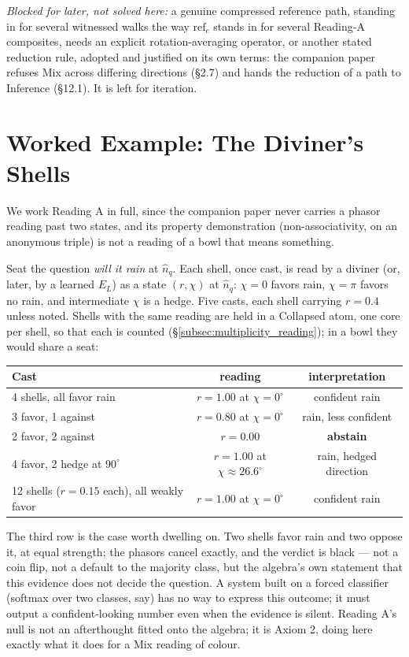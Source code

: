 \documentclass[12pt, a4paper]{article}
\begin{document}
\emph{Blocked for later, not solved here:} a genuine compressed
reference path, standing in for several witnessed walks the way
$\mathrm{ref}_c$ stands in for several Reading-A composites, needs
an explicit rotation-averaging operator, or another stated reduction
rule, adopted and justified on its own terms: the companion paper
refuses Mix across differing directions (\S2.7) and hands the reduction
of a path to Inference (\S12.1). It is left for iteration.

\section{Worked Example: The Diviner's Shells}
\label{sec:worked_example}

We work Reading A in full, since the companion paper never carries a
phasor reading past two states, and its property demonstration
(non-associativity, on an anonymous triple) is not a reading of a
bowl that means something.

Seat the question \emph{will it rain} at $\hat n_q$. Each shell, once
cast, is read by a diviner (or, later, by a learned $E_L$) as a state
$(r,\chi)$ at $\hat n_q$: $\chi=0$ favors rain, $\chi=\pi$ favors no
rain, and intermediate $\chi$ is a hedge. Five casts, each shell carrying $r=0.4$ unless noted. Shells with the same reading are held in a
Collapsed atom, one core per shell, so that each is counted (\S\ref{subsec:multiplicity_reading}); in a
bowl they would share a seat:

\begin{center}
\begin{tabular}{lcc}
\hline
Cast & reading & interpretation \\
\hline
4 shells, all favor rain      & $r=1.00$ at $\chi=0^\circ$   & confident rain \\
3 favor, 1 against            & $r=0.80$ at $\chi=0^\circ$   & rain, less confident \\
2 favor, 2 against            & $r=0.00$                     & \textbf{abstain} \\
4 favor, 2 hedge at $90^\circ$ & $r=1.00$ at $\chi\approx 26.6^\circ$ & rain, hedged direction \\
12 shells ($r=0.15$ each), all weakly favor    & $r=1.00$ at $\chi=0^\circ$   & confident rain \\
\hline
\end{tabular}
\end{center}

The third row is the case worth dwelling on. Two shells favor rain and
two oppose it, at equal strength; the phasors cancel exactly, and the
verdict is black --- not a coin flip, not a default to the majority
class, but the algebra's own statement that this evidence does not
decide the question. A system built on a forced classifier (softmax
over two classes, say) has no way to express this outcome; it must
output a confident-looking number even when the evidence is silent.
Reading A's null is not an afterthought fitted onto the algebra; it is
Axiom 2, doing here exactly what it does for a Mix reading of colour.
\end{document}
